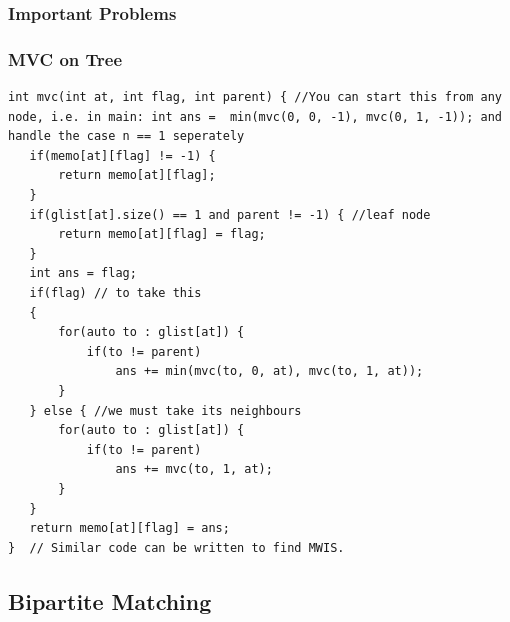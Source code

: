 \documentclass[8pt, a4paper, oneside, twocolumn]{extarticle}
\begin{document}
\subsubsection{Important Problems}
\subsubsection{MVC on Tree}
\begin{verbatim}
int mvc(int at, int flag, int parent) { //You can start this from any node, i.e. in main: int ans =  min(mvc(0, 0, -1), mvc(0, 1, -1)); and handle the case n == 1 seperately
   if(memo[at][flag] != -1) {
       return memo[at][flag];
   }
   if(glist[at].size() == 1 and parent != -1) { //leaf node
       return memo[at][flag] = flag;
   }
   int ans = flag;
   if(flag) // to take this
   {
       for(auto to : glist[at]) {
           if(to != parent)
               ans += min(mvc(to, 0, at), mvc(to, 1, at));
       }
   } else { //we must take its neighbours
       for(auto to : glist[at]) {
           if(to != parent)
               ans += mvc(to, 1, at);
       }
   }
   return memo[at][flag] = ans;
}  // Similar code can be written to find MWIS.
\end{verbatim}
\subsection{Bipartite Matching}
\end{document}
